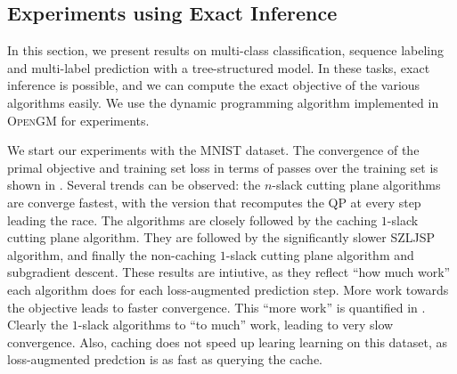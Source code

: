 \subsection{Experiments using Exact Inference}
In this section, we present results on multi-class classification, sequence
labeling and multi-label prediction with a tree-structured model. In these
tasks, exact inference is possible, and we can compute the exact objective of
the various algorithms easily. We use the dynamic programming algorithm
implemented in \textsc{OpenGM} for experiments.

We start our experiments with the MNIST dataset.
The convergence of the primal objective and training set loss in terms of
passes over the training set is shown in .
Several trends can be observed: the $n$-slack cutting plane algorithms are converge fastest, with
the version that recomputes the QP at every step leading the race. The algorithms are
closely followed by the caching $1$-slack cutting plane algorithm.
They are followed by the significantly slower SZLJSP algorithm, and finally
the non-caching $1$-slack cutting plane algorithm and subgradient descent.
These results are intiutive, as they reflect ``how much work'' each algorithm does
for each loss-augmented prediction step. More work towards the objective leads to faster convergence.
This ``more work'' is quantified in .
Clearly the $1$-slack algorithms to ``to much'' work, leading to very slow
convergence.  Also, caching does not speed up learing learning on this dataset,
as loss-augmented predction is as fast as querying the cache.

